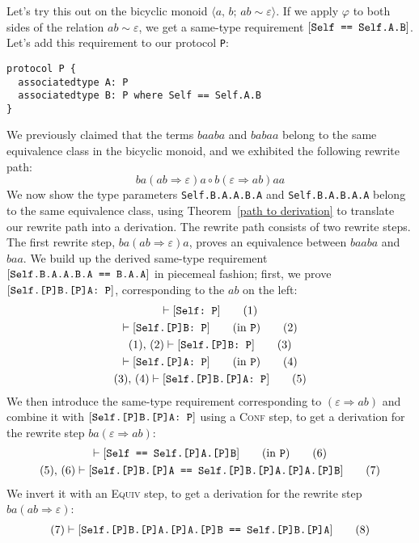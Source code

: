 \documentclass[../generics]{subfiles}
\begin{document}
Let's try this out on the bicyclic monoid $\langle a,\,b;\,ab\sim\varepsilon\rangle$. If we apply $\varphi$ to both sides of the relation $ab\sim\varepsilon$, we get a same-type requirement $[\texttt{Self == Self.A.B}]$. Let's add this requirement to our protocol \texttt{P}:
\begin{Verbatim}
protocol P {
  associatedtype A: P
  associatedtype B: P where Self == Self.A.B
}
\end{Verbatim}
We previously claimed that the terms $baaba$ and $babaa$ belong to the same equivalence class in the bicyclic monoid, and we exhibited the following rewrite path:
\[
ba(ab\Rightarrow\varepsilon)a \circ
b(\varepsilon\Rightarrow ab)aa
\]
We now show the type parameters \verb|Self.B.A.A.B.A| and \verb|Self.B.A.B.A.A| belong to the same equivalence class, using Theorem~\ref{path to derivation} to translate our rewrite path into a derivation. The rewrite path consists of two rewrite steps. The first rewrite step, $ba(ab\Rightarrow\varepsilon)a$, proves an equivalence between $baaba$ and $baa$. We build up the derived same-type requirement $[\texttt{Self.B.A.A.B.A == B.A.A}]$ in piecemeal fashion; first, we prove $[\texttt{Self.[P]B.[P]A:~P}]$, corresponding to the $ab$ on the left:
\begin{gather*}
\vdash[\texttt{Self:~P}]\tag{1}\\
\vdash[\texttt{Self.[P]B:~P}]\qquad\hbox{(in \texttt{P})}\tag{2}\\
(1),\,(2)\vdash[\texttt{Self.[P]B:~P}]\tag{3}\\
\vdash[\texttt{Self.[P]A:~P}]\qquad\hbox{(in \texttt{P})}\tag{4}\\
(3),\,(4)\vdash[\texttt{Self.[P]B.[P]A:~P}]\tag{5}
\end{gather*}
We then introduce the same-type requirement corresponding to $(\varepsilon\Rightarrow ab)$ and combine it with $[\texttt{Self.[P]B.[P]A:~P}]$ using a \textsc{Conf} step, to get a derivation for the rewrite step $ba(\varepsilon\Rightarrow ab)$:
\begin{gather*}
\vdash[\texttt{Self == Self.[P]A.[P]B}]\qquad\hbox{(in \texttt{P})}\tag{6}\\
(5),\,(6)\vdash[\texttt{Self.[P]B.[P]A == Self.[P]B.[P]A.[P]A.[P]B}]\tag{7}
\end{gather*}
We invert it with an \textsc{Equiv} step, to get a derivation for the rewrite step $ba(ab\Rightarrow \varepsilon)$:
\begin{gather*}
(7)\vdash[\texttt{Self.[P]B.[P]A.[P]A.[P]B == Self.[P]B.[P]A}]\tag{8}
\end{gather*}
\end{document}
